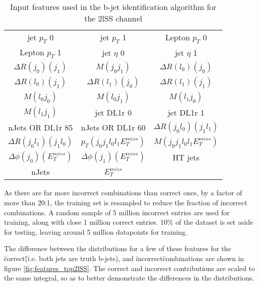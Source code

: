 \begin{table}[h!]
  \begin{center}
  \begin{tabular}{ccc}
  \hline\hline
    jet  $p_T$ 0 & jet  $p_T$ 1 & Lepton  $p_T$ 0 \\
    Lepton  $p_T$ 1 & jet  $\eta$ 0 & jet  $\eta$ 1 \\
    $\Delta R(j_0)(j_1)$ & $M(j_0j_1)$ & $\Delta R(l_0)(j_0)$ \\
    $\Delta R(l_0)(j_1)$ & $\Delta R(l_1)(j_0)$ & $\Delta R(l_1)(j_1)$ \\
    $M(l_0j_0)$ & $M(l_0j_1)$ & $M(l_1j_0)$ \\
    $M(l_1j_1)$ & jet DL1r 0 & jet DL1r 1 \\
    nJets OR DL1r 85 & nJets OR DL1r 60 & $\Delta R(j_0l_0)(j_1l_1)$ \\
    $\Delta R(j_0l_1)(j_1l_0)$ &  $p_T(j_0j_1l_0l_1E_T^{miss})$ & $M(j_0j_1l_0l_1E_T^{miss})$ \\
    $\Delta\phi(j_0)(E_T^{miss})$ & $\Delta\phi(j_1)(E_T^{miss})$ & HT jets \\
    nJets & $E_T^{miss}$ & \\
  \hline
  \end{tabular}
  \end{center}
  \caption{Input features used in the b-jet identification algorithm for the 2lSS channel}
  \label{tab:top2lSSfeatures}                                                                                               
\end{table}

As there are far more incorrect combinations than correct ones, by a factor of more than 20:1, the training set is resampled to reduce the fraction of incorrect combinations. A random sample of 5 million incorrect entries are used for training, along with close 1 million correct entries. 10\% of the dataset is set aside for testing, leaving around 5 million datapoints for training. 

The difference between the distributions for a few of these features for the \"correct\" (i.e. both jets are truth b-jets), and \"incorrect\" combinations are shown in figure \ref{fig:features_top2lSS}. The correct and incorrect contributions are scaled to the same integral, so as to better demonstrate the differences in the distributions.

